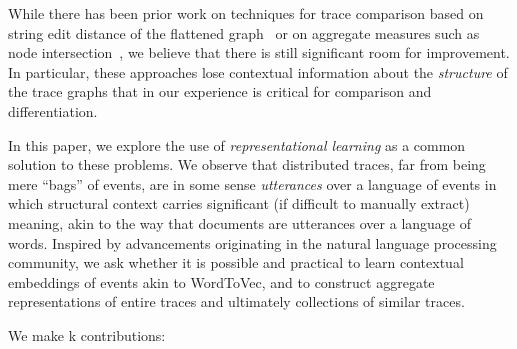 While there has been prior work on techniques for trace comparison based on string edit distance of the flattened graph~\cite{Barham:2003:MOM:1251054.1251069, Sambasivan:2011:DPC:1972457.1972463} or on aggregate measures such as node intersection~\cite{Las-Casas:2018:WSE:3267809.3267841}, we believe that
there is still significant room for improvement.  In particular, these approaches lose contextual information about the \emph{structure} of the 
trace graphs that in our experience is critical for comparison and differentiation.

In this paper, we explore the use of \emph{representational learning} as a common solution to these problems.  We observe that distributed traces,
far from being mere ``bags'' of events, are in some sense \emph{utterances} over a language of events in which structural context carries
significant (if difficult to manually extract) meaning, akin to the way that documents are utterances over a language of words. Inspired by
advancements originating in the natural language processing community, we ask whether it is possible and practical to learn contextual embeddings
of events akin to WordToVec, and to construct aggregate representations of entire traces and ultimately collections of similar traces.

We make k contributions:
